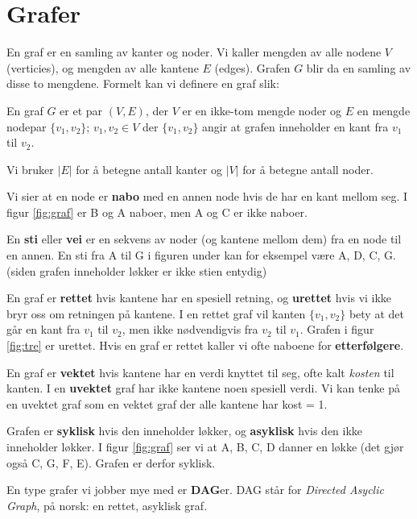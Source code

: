 \section{\color{red}Grafer}
En graf er en samling av kanter og noder. Vi kaller mengden av alle nodene $ V $ (verticies), og mengden av alle kantene $ E $ (edges). Grafen $ G $ blir da en samling av disse to mengdene. Formelt kan vi definere en graf slik:

\begin{definisjon}
En graf $ G $  er et par $ (V, E) $, der $ V $ er en ikke-tom mengde noder og $ E $ en mengde nodepar $ \{v_1, v_2\} $; $ v_1, v_2 \in V $ der $ \{v_1, v_2\} $ angir at grafen inneholder en kant fra $ v_1 $ til $ v_2 $.
\end{definisjon}

Vi bruker $ |E| $ for å betegne antall kanter og $ |V| $ for å betegne antall noder. 

Vi sier at en node er \textbf{nabo} med en annen node hvis de har en kant mellom seg. I figur \ref{fig:graf} er B og A naboer, men A og C er ikke naboer. 

En \textbf{sti} eller \textbf{vei} er en sekvens av noder (og kantene mellom dem) fra en node til en annen. En sti fra A til G i figuren under kan for eksempel være A, D, C, G. (siden grafen inneholder løkker er ikke stien entydig)

En graf er \textbf{rettet} hvis kantene har en spesiell retning, og \textbf{urettet} hvis vi ikke bryr oss om retningen på kantene. I en rettet graf vil kanten $ \{v_1, v_2\} $ bety at det går en kant fra $ v_1 $ til $ v_2 $, men ikke nødvendigvis fra $ v_2 $ til $ v_1 $. Grafen i figur \ref{fig:tre} er urettet. Hvis en graf er rettet kaller vi ofte naboene for \textbf{etterfølgere}. 

En graf er \textbf{vektet} hvis kantene har en verdi knyttet til seg, ofte kalt \emph{kosten} til kanten. I en \textbf{uvektet} graf har ikke kantene noen spesiell verdi. Vi kan tenke på en uvektet graf som en vektet graf der alle kantene har kost = 1.

Grafen er \textbf{syklisk} hvis den inneholder løkker, og \textbf{asyklisk} hvis den ikke inneholder løkker. I figur \ref{fig:graf} ser vi at A, B, C, D danner en løkke (det gjør også C, G, F, E). Grafen er derfor syklisk.

En type grafer vi jobber mye med er \textbf{DAG}er. DAG står for \emph{Directed Asyclic Graph}, på norsk: en rettet, asyklisk graf. 


